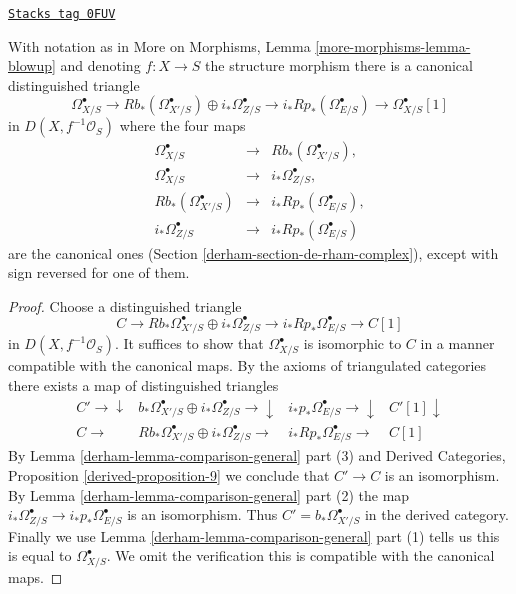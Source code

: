 \begin{lemma}
\label{derham-lemma-distinguished-triangle-blowup}
\href{https://stacks.math.columbia.edu/tag/0FUV}{\texttt{Stacks tag 0FUV}}

With notation as in More on Morphisms, Lemma \ref{more-morphisms-lemma-blowup}
and denoting $f : X \to S$ the structure morphism there is a canonical
distinguished triangle
$$
\Omega^\bullet_{X/S} \to
Rb_*(\Omega^\bullet_{X'/S}) \oplus i_*\Omega^\bullet_{Z/S} \to
i_*Rp_*(\Omega^\bullet_{E/S}) \to
\Omega^\bullet_{X/S}[1]
$$
in $D(X, f^{-1}\mathcal{O}_S)$ where the four maps
$$
\begin{matrix}
\Omega^\bullet_{X/S} & \to & Rb_*(\Omega^\bullet_{X'/S}), \\
\Omega^\bullet_{X/S} & \to & i_*\Omega^\bullet_{Z/S}, \\
Rb_*(\Omega^\bullet_{X'/S}) & \to & i_*Rp_*(\Omega^\bullet_{E/S}), \\
i_*\Omega^\bullet_{Z/S} & \to & i_*Rp_*(\Omega^\bullet_{E/S})
\end{matrix}
$$
are the canonical ones (Section \ref{derham-section-de-rham-complex}),
except with sign reversed for one of them.
\end{lemma}

\begin{proof}

Choose a distinguished triangle
$$
C \to Rb_*\Omega^\bullet_{X'/S} \oplus i_*\Omega^\bullet_{Z/S}
\to i_*Rp_*\Omega^\bullet_{E/S} \to C[1]
$$
in $D(X, f^{-1}\mathcal{O}_S)$. It suffices to show that
$\Omega^\bullet_{X/S}$ is isomorphic to $C$ in a manner compatible
with the canonical maps. By the axioms of triangulated categories
there exists a map of distinguished triangles
$$
\begin{array}{cccc}C' \longrightarrow\downarrow & b_*\Omega^\bullet_{X'/S} \oplus i_*\Omega^\bullet_{Z/S} \longrightarrow\downarrow & i_*p_*\Omega^\bullet_{E/S} \longrightarrow\downarrow & C'[1] \downarrow \\ C \longrightarrow & Rb_*\Omega^\bullet_{X'/S} \oplus i_*\Omega^\bullet_{Z/S} \longrightarrow & i_*Rp_*\Omega^\bullet_{E/S} \longrightarrow & C[1]\end{array}
$$
By Lemma \ref{derham-lemma-comparison-general} part (3) and
Derived Categories, Proposition \ref{derived-proposition-9} we conclude that
$C' \to C$ is an isomorphism. By Lemma \ref{derham-lemma-comparison-general} part (2)
the map $i_*\Omega^\bullet_{Z/S} \to i_*p_*\Omega^\bullet_{E/S}$
is an isomorphism. Thus $C' = b_*\Omega^\bullet_{X'/S}$
in the derived category. Finally we use Lemma \ref{derham-lemma-comparison-general}
part (1) tells us this is equal to $\Omega^\bullet_{X/S}$.
We omit the verification this is compatible with the canonical maps.
\end{proof}

